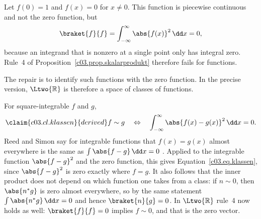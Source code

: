 \begin{fundament}[id=c03.f2,
    titel={Functions that differ only on a null set},
    wozu={Block~\ref{c03.v2} leaves open whether $\braket{f}{f} = 0$ holds only for $f = 0$.
      For functions it does not. Here is the repair and what it means for the value of a
      function at a single point.},
    voraussetzung={Block~\ref{c03.v2}. Lebesgue measure and the Lebesgue integral are used by
      name only.},
    zurueck={Two functions that differ only at single points are the same vector in
      $\Ltwo{\mathbb{R}}$. The value at a single point has no meaning, but integrals over
      intervals do.}]
  \begin{example}\label{c03.ex.punkt}
    Let $f(0) = 1$ and $f(x) = 0$ for $x \neq 0$. This function is piecewise continuous and
    not the zero function, but
    \begin{equation}\label{c03.eq.punkt}
      \braket{f}{f} = \int_{-\infty}^{\infty} \abs{f(x)}^2\, \dd x = 0 ,
    \end{equation}
    because an integrand that is nonzero at a single point only has integral zero. Rule~4 of
    Proposition~\ref{c03.prop.skalarprodukt} therefore fails for functions.
  \end{example}

  The repair is to identify such functions with the zero function. In the precise version,
  $\Ltwo{\mathbb{R}}$ is therefore a space of classes of functions.


  For square-integrable $f$ and $g$,
  \begin{equation}\label{c03.eq.klassen}\claim{c03.cl.klassen}{derived}
    f \sim g
    \quad \Leftrightarrow \quad
    \int_{-\infty}^{\infty} \abs{f(x) - g(x)}^2\, \dd x = 0 .
  \end{equation}
  Reed and Simon say for integrable functions that $f(x) = g(x)$ almost everywhere is the same
  as $\int \abs{f - g}\, \dd x = 0$ . Applied to the integrable
  function $\abs{f - g}^2$ and the zero function, this gives
  Equation~\eqref{c03.eq.klassen}, since $\abs{f - g}^2$ is zero exactly where $f = g$. It
  also follows that the inner product does not depend on which function one takes from a
  class: if $n \sim 0$, then $\abs{n^* g}$ is zero almost everywhere, so by the same statement
  $\int \abs{n^* g}\, \dd x = 0$ and hence $\braket{n}{g} = 0$. In $\Ltwo{\mathbb{R}}$ rule~4
  now holds as well: $\braket{f}{f} = 0$ implies $f \sim 0$, and that is the zero vector.


\end{fundament}

